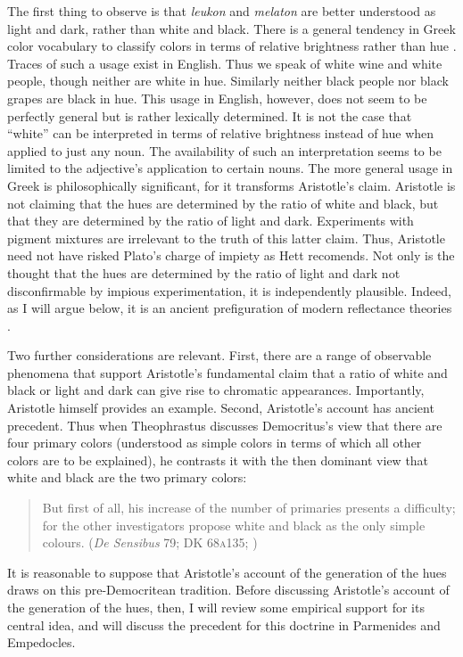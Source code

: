 The first thing to observe is that \emph{leukon} and \emph{melaton} are better understood as light and dark, rather than white and black. There is a general tendency in Greek color vocabulary to classify colors in terms of relative brightness rather than hue \citep[see][]{Gladstone:1858fk,Platnauer:1921bh,Osbourne:1968vn,Lloyd:2007fk}. Traces of such a usage exist in English. Thus we speak of white wine and white people, though neither are white in hue. Similarly neither black people nor black grapes are black in hue. This usage in English, however, does not seem to be perfectly general but is rather lexically determined. It is not the case that ``white'' can be interpreted in terms of relative brightness instead of hue when applied to just any noun. The availability of such an interpretation seems to be limited to the adjective's application to certain nouns. The more general usage in Greek is philosophically significant, for it transforms Aristotle's claim. Aristotle is not claiming that the hues are determined by the ratio of white and black, but that they are determined by the ratio of light and dark. Experiments with pigment mixtures are irrelevant to the truth of this latter claim. Thus, Aristotle need not have risked Plato's charge of impiety as Hett recomends. Not only is the thought that the hues are determined by the ratio of light and dark not disconfirmable by impious experimentation, it is independently plausible. Indeed, as I will argue below, it is an ancient prefiguration of modern reflectance theories \citep[see][]{Hilbert:1987jq}.

Two further considerations are relevant. First, there are a range of observable phenomena that support Aristotle's fundamental claim that a ratio of white and black or light and dark can give rise to chromatic appearances. Importantly, Aristotle himself provides an example. Second, Aristotle's account has ancient precedent. Thus when Theophrastus discusses Democritus's view that there are four primary colors (understood as simple colors in terms of which all other colors are to be explained), he contrasts it with the then dominant view that white and black are the two primary colors:
\begin{quote}
    But first of all, his increase of the number of primaries presents a difficulty; for the other investigators propose white and black as the only simple colours. (\emph{De Sensibus} 79; DK 68\textsc{a}135; \citealt{Stratton:1917vn})
\end{quote}
It is reasonable to suppose that Aristotle's account of the generation of the hues draws on this pre-Democritean tradition. Before discussing Aristotle's account of the generation of the hues, then, I will review some empirical support for its central idea, and will discuss the precedent for this doctrine in Parmenides and Empedocles.

